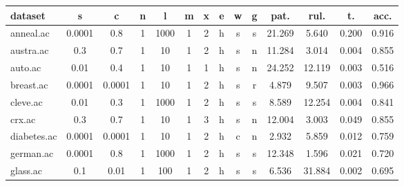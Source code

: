 \begin{table}[htbp]
	\centering
		\begin{tabular}{|l|c|c|c|c|c|c|c|c|c||c|c|c|c|}
		\hline
		\textbf{dataset}	& \textbf{s}	& \textbf{c}	& \textbf{n}	& \textbf{l}	& \textbf{m}	& \textbf{x}	& \textbf{e} & \textbf{w} & \textbf{g} & \textbf{pat.}	& \textbf{rul.}	& \textbf{t.}	& \textbf{acc.}	\\
		\hline
		anneal.ac      & 0.0001   & 0.8         & 1              & 1000                & 1             & 2             & h      & s        & s        & 21.269         & 5.640          & 0.200          & 0.916          \\
		\hline
		austra.ac      & 0.3      & 0.7         & 1              & 10                  & 1             & 2             & h      & s        & n        & 11.284         & 3.014          & 0.004          & 0.855          \\
		\hline
		auto.ac        & 0.01     & 0.4         & 1              & 10                  & 1             & 1             & h      & s        & n        & 24.252         & 12.119         & 0.003          & 0.516          \\
		\hline
		breast.ac      & 0.0001   & 0.0001      & 1              & 10                  & 1             & 2             & h      & s        & r        & 4.879          & 9.507          & 0.003          & 0.966          \\
		\hline
		cleve.ac       & 0.01     & 0.3         & 1              & 1000                & 1             & 2             & h      & s        & s        & 8.589          & 12.254         & 0.004          & 0.841          \\
		\hline
		crx.ac         & 0.3      & 0.7         & 1              & 10                  & 1             & 3             & h      & s        & n        & 12.004         & 3.003          & 0.049          & 0.855          \\
		\hline
		diabetes.ac    & 0.0001   & 0.0001      & 1              & 10                  & 1             & 2             & h      & c        & n        & 2.932          & 5.859          & 0.012          & 0.759          \\
		\hline
		german.ac      & 0.0001   & 0.8         & 1              & 1000                & 1             & 2             & h      & s        & s        & 12.348         & 1.596          & 0.021          & 0.720          \\
		\hline
		glass.ac       & 0.1      & 0.01        & 1              & 100                 & 1             & 2             & h      & s        & s        & 6.536          & 31.884         & 0.002          & 0.695          \\

\end{tabular}
\end{table}
